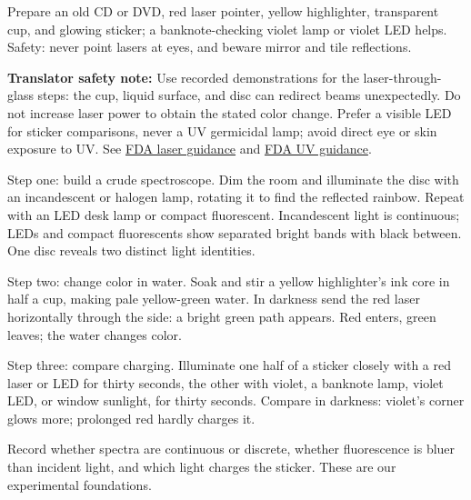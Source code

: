 \begin{experiment}
Prepare an old CD or DVD, red laser pointer, yellow highlighter, transparent cup, and glowing sticker; a banknote-checking violet lamp or violet LED helps. Safety: never point lasers at eyes, and beware mirror and tile reflections.

\textbf{Translator safety note:} Use recorded demonstrations for the laser-through-glass steps: the cup, liquid surface, and disc can redirect beams unexpectedly. Do not increase laser power to obtain the stated color change. Prefer a visible LED for sticker comparisons, never a UV germicidal lamp; avoid direct eye or skin exposure to UV. See \href{https://www.fda.gov/consumers/consumer-updates/laser-toys-how-keep-kids-safe}{FDA laser guidance} and \href{https://www.fda.gov/radiation-emitting-products/tanning/ultraviolet-uv-radiation}{FDA UV guidance}.

Step one: build a crude spectroscope. Dim the room and illuminate the disc with an incandescent or halogen lamp, rotating it to find the reflected rainbow. Repeat with an LED desk lamp or compact fluorescent. Incandescent light is continuous; LEDs and compact fluorescents show separated bright bands with black between. One disc reveals two distinct light identities.

Step two: change color in water. Soak and stir a yellow highlighter's ink core in half a cup, making pale yellow-green water. In darkness send the red laser horizontally through the side: a bright green path appears. Red enters, green leaves; the water changes color.

Step three: compare charging. Illuminate one half of a sticker closely with a red laser or LED for thirty seconds, the other with violet, a banknote lamp, violet LED, or window sunlight, for thirty seconds. Compare in darkness: violet's corner glows more; prolonged red hardly charges it.

Record whether spectra are continuous or discrete, whether fluorescence is bluer than incident light, and which light charges the sticker. These are our experimental foundations.
\end{experiment}


